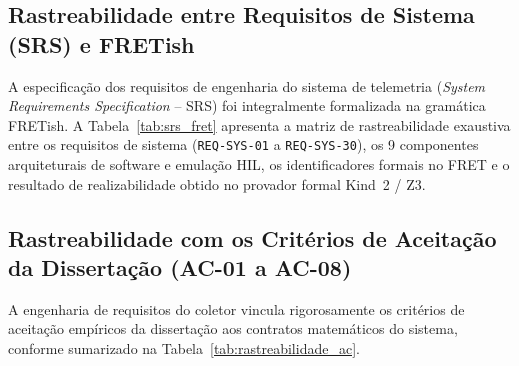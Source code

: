\subsection{Rastreabilidade entre Requisitos de Sistema (SRS) e FRETish}
A especificação dos requisitos de engenharia do sistema de telemetria (\textit{System Requirements Specification} -- SRS) foi integralmente formalizada na gramática FRETish. A Tabela~\ref{tab:srs_fret} apresenta a matriz de rastreabilidade exaustiva entre os requisitos de sistema (\texttt{REQ-SYS-01} a \texttt{REQ-SYS-30}), os 9 componentes arquiteturais de software e emulação HIL, os identificadores formais no FRET e o resultado de realizabilidade obtido no provador formal Kind~2 / Z3.



\subsection{Rastreabilidade com os Critérios de Aceitação da Dissertação (AC-01 a AC-08)}
A engenharia de requisitos do coletor vincula rigorosamente os critérios de aceitação empíricos da dissertação aos contratos matemáticos do sistema, conforme sumarizado na Tabela~\ref{tab:rastreabilidade_ac}.



